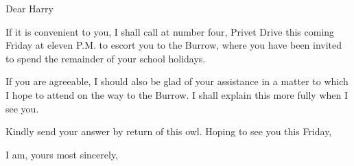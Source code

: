 \documentclass[11pt]{IFSCommunication}
\begin{document}

{}  %
\senderDept{}  %
{}  %
{}  %
{}  %
{}  %
{} %
{} %
{}  %
{} %





Dear Harry

If it is convenient to you, I shall call at number four, Privet Drive this coming Friday at eleven P.M. to escort you to the Burrow, where you have been invited to spend the remainder of your school holidays.

If you are agreeable, I should also be glad of your assistance in a matter to which I hope to attend on the way to the Burrow. I shall explain this more fully when I see you.

Kindly send your answer by return of this owl. Hoping to see you this Friday,

\closing{I am, yours most sincerely,}
\end{document}
